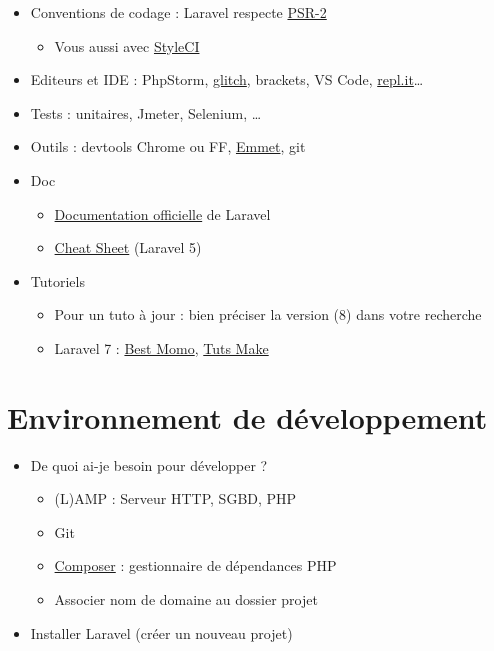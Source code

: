 \begin{itemize}
\tightlist
\item
  Conventions de codage : Laravel respecte
  \href{https://laravel.com/docs/5.1/contributions\#coding-style}{PSR-2}

  \begin{itemize}
  \tightlist
  \item
    Vous aussi avec \href{https://styleci.io/}{StyleCI}
  \end{itemize}
\item
  Editeurs et IDE : PhpStorm, \href{https://glitch.com/}{glitch},
  brackets, VS Code, \href{https://repl.it/}{repl.it}\ldots{}
\item
  Tests : unitaires, Jmeter, Selenium, \ldots{}
\item
  Outils : devtools Chrome ou FF, \href{http://emmet.io/}{Emmet}, git
\item
  Doc

  \begin{itemize}
  \tightlist
  \item
    \href{https://laravel.com/docs/master}{Documentation officielle} de
    Laravel
  \item
    \href{https://summerblue.github.io/laravel5-cheatsheet/\#}{Cheat
    Sheet} (Laravel 5)
  \end{itemize}
\item
  Tutoriels

  \begin{itemize}
  \tightlist
  \item
    Pour un tuto à jour : bien préciser la version (8) dans votre
    recherche
  \item
    Laravel 7 : \href{https://laravel.sillo.org/laravel-7/}{Best Momo},
    \href{https://www.tutsmake.com/laravel-6-tutorial-from-scratch-laravel-step-by-step/}{Tuts
    Make}
  \end{itemize}
\end{itemize}

\hypertarget{environnement-de-duxe9veloppement}{%
\section{Environnement de
développement}\label{environnement-de-duxe9veloppement}}

\begin{itemize}
\tightlist
\item
  De quoi ai-je besoin pour développer ?

  \begin{itemize}
  \tightlist
  \item
    (L)AMP : Serveur HTTP, SGBD, PHP
  \item
    Git
  \item
    \href{https://getcomposer.org/}{Composer} : gestionnaire de
    dépendances PHP
  \item
    Associer nom de domaine au dossier projet
  \end{itemize}
\item
  Installer Laravel (créer un nouveau projet)
\end{itemize}

